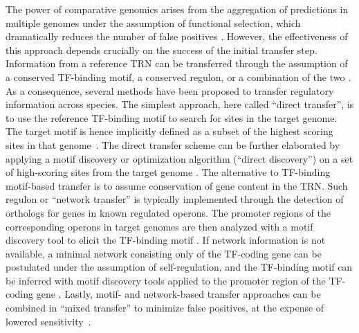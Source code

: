 The power of comparative genomics arises from the aggregation of predictions in
multiple genomes under the assumption of functional selection, which
dramatically reduces the number of false positives
\citep{gelfand2000comparative}. However, the effectiveness of this approach
depends crucially on the success of the initial transfer step. Information from
a reference TRN can be transferred through the assumption of a conserved
TF-binding motif, a conserved regulon, or a combination of the two
\citep{babu2008computational, baumbach2010power}. As a consequence, several
methods have been proposed to transfer regulatory information across
species. The simplest approach, here called “direct transfer”, is to use the
reference TF-binding motif to search for sites in the target genome. The target
motif is hence implicitly defined as a subset of the highest scoring sites in
that genome~\citep{tan2001comparative, makarova2001conservation,
  erill2004differences, rodionov2013transcriptional}.
The direct transfer scheme can be further elaborated by applying a motif discovery
or optimization algorithm (``direct discovery'')
on a set of high-scoring sites from the target genome
\citep{baumbach2009reliable, habib2012functional}. The alternative to TF-binding
motif-based transfer is to assume conservation of gene content in the
TRN\@. Such regulon or “network transfer” is typically implemented through the
detection of orthologs for genes in known regulated operons. The promoter
regions of the corresponding operons in target genomes are then analyzed with a
motif discovery tool to elicit the TF-binding motif
\citep{mccue2001phylogenetic, wang2003combining, panina2003comparative,
  zhang2009genome}. If network information is not available, a minimal network
consisting only of the TF-coding gene can be postulated under the assumption of
self-regulation, and the TF-binding motif can be inferred with motif discovery
tools applied to the promoter region of the TF-coding gene
\citep{francke2008generic, cornish2012inference,
  ravcheev2014comparative}. Lastly, motif- and network-based transfer
approaches can be combined in “mixed transfer” to minimize false positives, at
the expense of lowered sensitivity~\citep{baumbach2010power,
  baumbach2009reliable, yu2004annotation}.

